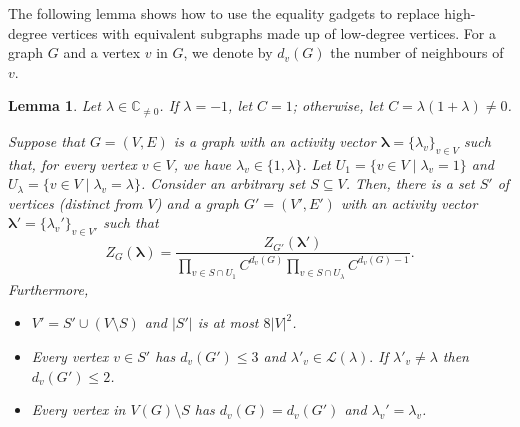 \documentclass[11pt]{article}
\newtheorem{lemma}[theorem]{Lemma}
\def\Complex{\mathbb{C}}
\def\lambdab{\ensuremath{\boldsymbol{\lambda}}}
\begin{document}
The following lemma shows how to use the equality gadgets  to 
replace high-degree vertices with equivalent subgraphs made up of low-degree vertices.
For a graph $G$ and a vertex $v$ in $G$, we denote by $d_v(G)$ the number of neighbours of $v$.
\begin{lemma}\label{lem:equality}
Let $\lambda\in \Complex_{\neq 0}$. 
If $\lambda=-1$, let $C=1$; otherwise, let 
$C= \lambda(1+\lambda)\neq 0$.

Suppose that $G=(V,E)$ is a graph with an activity vector $\lambdab=\{\lambda_v\}_{v\in V}$ such that, for
every vertex $v\in V$, we have $\lambda_v \in \{1,\lambda\}$.
Let $U_1 = \{ v\in V \mid \lambda_v = 1\}$ and $U_\lambda = \{v\in V \mid \lambda_v=\lambda\}$. Consider an arbitrary set $S\subseteq V$.
Then, there is a set $S'$ of vertices (distinct from $V$)
and a graph $G'=(V',E')$ with an activity vector $\lambdab'=\{\lambda_v'\}_{v\in V'}$ such  that
$$Z_G(\lambdab) = \frac{Z_{G'}(\lambdab')}
{
\prod_{v\in S\cap U_1} C^{d_v(G)} 
\prod_{v\in S\cap U_\lambda} C^{d_v(G)-1}}.$$
 Furthermore,
\begin{itemize}
\item $V' = S' \cup (V\setminus S)$ and $|S'|$ is at most  $8 |V|^2$.
\item Every vertex $v\in S'$ has $d_v(G')\leq 3$ and $\lambda'_v \in \mathcal{L}(\lambda).$
If $\lambda'_v\neq \lambda$ then $d_v(G') \leq 2$.
\item Every vertex  in $V(G)\setminus S$ 
has $d_v(G)=d_v(G')$ and $\lambda_v'=\lambda_v$.
\end{itemize}
 \end{lemma}
\end{document}
